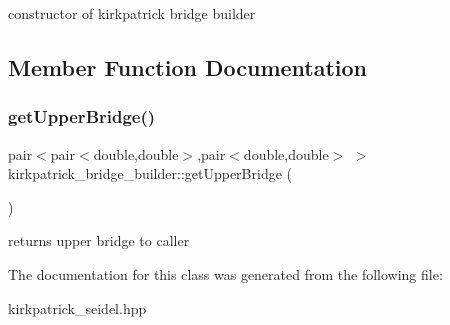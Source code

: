 constructor of kirkpatrick bridge builder 

\subsection{Member Function Documentation}
\mbox{\label{classkirkpatrick__bridge__builder_a98f6901abab1a0d8642a0d302675bba0}} 
\subsubsection{\texorpdfstring{get\+Upper\+Bridge()}{getUpperBridge()}}
{\footnotesize\ttfamily pair$<$pair$<$double,double$>$,pair$<$double,double$>$ $>$ kirkpatrick\+\_\+bridge\+\_\+builder\+::get\+Upper\+Bridge (\begin{DoxyParamCaption}{ }\end{DoxyParamCaption})\hspace{0.3cm}{\ttfamily [inline]}}

returns upper bridge to caller 

The documentation for this class was generated from the following file\+:\begin{DoxyCompactItemize}
\item 
kirkpatrick\+\_\+seidel.\+hpp\end{DoxyCompactItemize}
